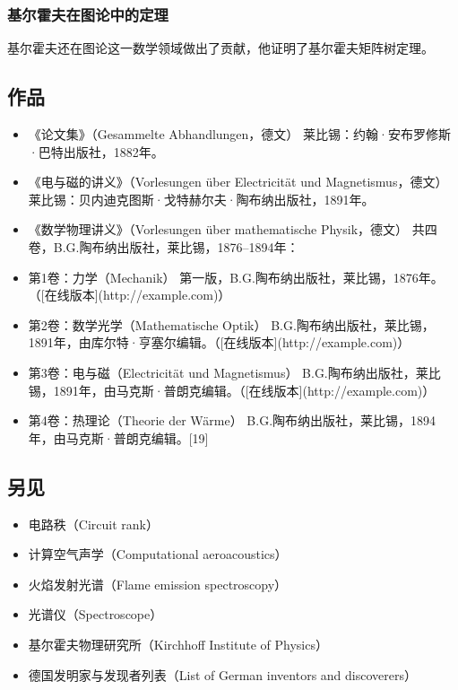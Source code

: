 \subsubsection{基尔霍夫在图论中的定理} 
基尔霍夫还在图论这一数学领域做出了贡献，他证明了基尔霍夫矩阵树定理。
\subsection{作品} 
\begin{itemize}
\item 《论文集》（Gesammelte Abhandlungen，德文）  
  莱比锡：约翰·安布罗修斯·巴特出版社，1882年。  
\item 《电与磁的讲义》（Vorlesungen über Electricität und Magnetismus，德文） 
  莱比锡：贝内迪克图斯·戈特赫尔夫·陶布纳出版社，1891年。  
\item 《数学物理讲义》（Vorlesungen über mathematische Physik，德文）
  共四卷，B.G.陶布纳出版社，莱比锡，1876–1894年：
\end{itemize}  
\begin{itemize}
\item 第1卷：力学（Mechanik）  
    第一版，B.G.陶布纳出版社，莱比锡，1876年。（[在线版本](http://example.com)）  
\item 第2卷：数学光学（Mathematische Optik） 
    B.G.陶布纳出版社，莱比锡，1891年，由库尔特·亨塞尔编辑。（[在线版本](http://example.com)）  
\item 第3卷：电与磁（Electricität und Magnetismus） 
    B.G.陶布纳出版社，莱比锡，1891年，由马克斯·普朗克编辑。（[在线版本](http://example.com)）  
\item 第4卷：热理论（Theorie der Wärme） 
    B.G.陶布纳出版社，莱比锡，1894年，由马克斯·普朗克编辑。[19]
\end{itemize}
\subsection{另见} 
\begin{itemize}
\item 电路秩（Circuit rank）  
\item 计算空气声学（Computational aeroacoustics）  
\item 火焰发射光谱（Flame emission spectroscopy）  
\item 光谱仪（Spectroscope）  
\item 基尔霍夫物理研究所（Kirchhoff Institute of Physics） 
\item 德国发明家与发现者列表（List of German inventors and discoverers）
\end{itemize} 
